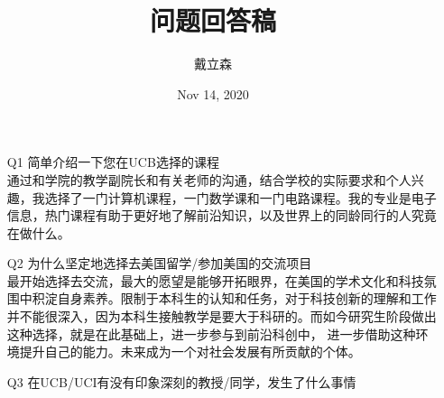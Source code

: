 \documentclass[10pt]{article}
\title{
    问题回答稿
}
\author{戴立森}
\date{Nov 14, 2020}
\begin{document}
    \maketitle
    \begin{itemize}
        \item [{\large Q1}]{
            {\large 简单介绍一下您在UCB选择的课程} \\
            通过和学院的教学副院长和有关老师的沟通，结合学校的实际要求和个人兴趣，我选择了一门计算机课程，一门数学课和一门电路课程。我的专业是电子信息，热门课程有助于更好地了解前沿知识，以及世界上的同龄同行的人究竟在做什么。
        }
        \item [{\large Q2}]{
            {\large 为什么坚定地选择去美国留学/参加美国的交流项目} \\
            最开始选择去交流，最大的愿望是能够开拓眼界，在美国的学术文化和科技氛围中积淀自身素养。限制于本科生的认知和任务，对于科技创新的理解和工作并不能很深入，因为本科生接触教学是要大于科研的。而如今研究生阶段做出这种选择，就是在此基础上，进一步参与到前沿科创中，
            进一步借助这种环境提升自己的能力。未来成为一个对社会发展有所贡献的个体。
            }
        \item [{\large Q3}]{
            {\large 在UCB/UCI有没有印象深刻的教授/同学，发生了什么事情} \\

}
\end{itemize}
\end{document}
